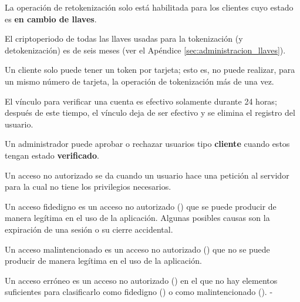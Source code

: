 {
  La operación de retokenización solo está habilitada para los clientes cuyo
  estado es \textbf{en cambio de llaves}.

}

{
  El criptoperiodo de todas las llaves usadas para la tokenización (y
  detokenización) es de seis meses (ver el Apéndice
  \ref{sec:administracion_llaves}).
}

{
  Un cliente solo puede tener un token por tarjeta; esto es, no puede realizar,
  para un mismo número de tarjeta, la operación de tokenización más de una vez.
}



{
  El vínculo para verificar una cuenta es efectivo solamente durante
  24 horas; después de este tiempo, el vínculo deja de ser efectivo y se elimina
  el registro del usuario.
}

{
  Un administrador puede aprobar o rechazar usuarios tipo \textbf{cliente}
  cuando estos tengan estado \textbf{verificado}.
}

{
  Un acceso no autorizado se da cuando un usuario hace una petición al servidor
  para la cual no tiene los privilegios necesarios.
}

{
  Un acceso fidedigno es un acceso no autorizado
  () que se puede producir de manera
  legítima en el uso de la aplicación. Algunas posibles causas son la expiración
  de una sesión o su cierre accidental.
}


{
  Un acceso malintencionado es un acceso no autorizado
  () que no se puede producir de manera
  legítima en el uso de la aplicación.
}

{
  Un acceso erróneo es un acceso no autorizado
  () en el que no hay elementos
  suficientes para clasificarlo como fidedigno
  () o como malintencionado
  ().
}-
